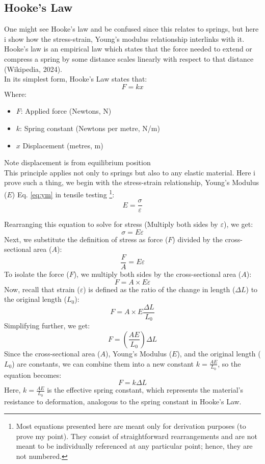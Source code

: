 \documentclass{article}
\begin{document}
{    \subsection{Hooke's Law}
    One might see Hooke's law and be confused since this relates to springs, but here i show how the stress-strain, Young's modulus relationship interlinks with it. Hooke's law is an empirical law which states that the force needed to extend or compress a spring by some distance scales linearly with respect to that distance (Wikipedia, 2024).\\[8pt]
    In its simplest form, Hooke's Law states that:
    \begin{equation}
        F = kx
    \end{equation}
    Where:
    \begin{itemize}[itemsep=-1mm]
        \item $F$: Applied force (Newtons, N)
        \item $k$: Spring constant (Newtons per metre, N/m)
        \item $x$ Displacement (metres, m)
    \end{itemize}
    Note displacement is from equilibrium position\\[8pt] 
    This principle applies not only to springs but also to any elastic material. Here i prove such a thing, we begin with the stress-strain relationship, Young's Modulus (\(E\)) Eq. \ref{eq:ym} in tensile testing \footnote{Most equations presented here are meant only for derivation purposes (to prove my point). They consist of straightforward rearrangements and are not meant to be individually referenced at any particular point; hence, they are not numbered.}:    
    \[E = \frac{\sigma}{\varepsilon}\]
    \begin{center}
    Rearranging this equation to solve for stress (Multiply both sides by \(\varepsilon\)), we get:
    \[\sigma = E\varepsilon\]
    Next, we substitute the definition of stress as force (\(F\)) divided by the cross-sectional area (\(A\)):
    \[\frac{F}{A} = E\varepsilon\]
    To isolate the force (\(F\)), we multiply both sides by the cross-sectional area (\(A\)):
    \[F = A \times E\varepsilon\]
    Now, recall that strain (\(\varepsilon\)) is defined as the ratio of the change in length (\(\Delta L\)) to the original length (\(L_0\)):
    \[F = A \times E\frac{\Delta L}{L_0}\]
    Simplifying further, we get:
    \[F = \left(\frac{AE}{L_0}\right)\Delta L\]
    Since the cross-sectional area (\(A\)), Young's Modulus (\(E\)), and the original length (\(L_0\)) are constants, we can combine them into a new constant \(k = \frac{AE}{L_0}\), so the equation becomes:
    \begin{equation}
        F = k\Delta L
    \end{equation}
    Here, \(k = \frac{AE}{L_0}\) is the effective spring constant, which represents the material's resistance to deformation, analogous to the spring constant in Hooke's Law.    
    \end{center}
    \newpage



}
\end{document}
